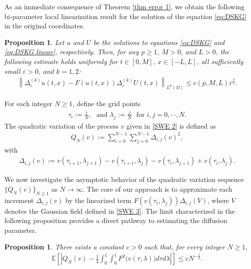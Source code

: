 \documentclass[11pt,reqno]{amsart}
\numberwithin{equation}{section}
\newtheorem{proposition}[theorem]{Proposition}
\newcommand{\1}{{\bf 1}}
\newcommand{\2}{{\bf 2}}
\begin{document}
  As an immediate consequence of Theorem \ref{thm error 1}, we obtain the following bi-parameter local linearization result for the solution of  the equation \eqref{eq:DSKG} in the original coordinates.
  \begin{proposition}\label{thm error 2} Let $u$ and $U$ be the solutions to equations \eqref{eq:DSKG} and \eqref{eq:DSKG linear}, respectively. Then,  for any $p \ge 1$, $M>0$, and $L>0$,  the following estimate holds   uniformly for $t\in [0, M]$, $x\in [-L, L]$,   all sufficiently small $\varepsilon > 0$, and $k=1, 2$:  
\begin{equation}\label{eq error 2}
\begin{split}
 \left\| \Delta_{\varepsilon}^{(k)} u(t, x) - F(u(t,x)) \Delta_{\varepsilon}^{(k)} U(t, x) \right\|_{L^p(\Omega)}  \le c(p, M, L)   \varepsilon^{  \frac{3}{2}}.
\end{split}
\end{equation} 
\end{proposition} 
    

       For each integer $N\ge1$, define the grid points  
     \begin{align}\label{eq grid}
      \tau_i:=\frac{i}{N},  \ \ \ \text{and } \lambda_j:=\frac{j}{N} \ \ \ \text{for } i, j=0, \cdots, N.
       \end{align}  
      The   quadratic  variation of   the process $v$ given in \eqref{SWE 2}  is defined as 
  \begin{align}\label{eq V v}
Q_{N}(v):=  \sum_{i=0}^{N-1}\sum_{j=0}^{N-1}\Delta_{i,j}(v)^2,
\end{align} 
with
\begin{align}\label{eq V ij}
\Delta_{i,j}(v)  := v\left(\tau_{i+1}, \lambda_{j+1}  \right)-v\left(\tau_{i+1}, \lambda_{j}\right)-v\left(\tau_{i}, \lambda_{j+1}  \right) +v\left(\tau_{i}, \lambda_{j}    \right).
\end{align}
      
 
 We now investigate  the   asymptotic behavior of the quadratic variation sequence $\{Q_{N}(v)\}_{ N\ge 1}$  as $N\rightarrow\infty$.  
The core of our approach is to  approximate each increment $\Delta_{i,j}(v)$  by the linearized term $F(v(\tau_i, \lambda_j))\Delta_{i,j}(V)$, where $V$ denotes  the Gaussian field  defined in  \eqref{SWE 3}.    
    The  limit  characterized in the following  proposition  provides a direct  pathway  to  estimating the diffusion parameter. 
    \begin{proposition}\label{prop variation converge}  
  There exists a constant $c>0$ such that,  for every integer    $N\ge 1$, 
  \begin{align}\label{eq quad}
  \mathbb E\left[\left| Q_{N}(v)-  \frac{1}{4} \int_0^1\int_0^1   F^2\big(v(\tau, \lambda) \big) d\tau d\lambda \right|  \right]\le c N^{- \frac12}.
  \end{align} 
   \end{proposition} 
\end{document}
